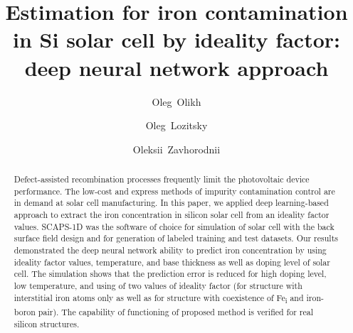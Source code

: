\documentclass[num-refs]{wiley-article} %
\title{Estimation for iron contamination in Si solar cell by ideality factor: deep neural network approach}
\author[1]{Oleg~Olikh}
\author[1]{Oleg~Lozitsky}
\author[1]{Oleksii~Zavhorodnii}
\affil[1]{Taras Shevchenko National University of Kyiv, 64/13, Volodymyrska Street, Kyiv, 01601, Ukraine}
\begin{document}
\begin{frontmatter}
\maketitle

\begin{abstract}
Defect-assisted recombination processes frequently
limit the photovoltaic device performance.
The low-cost and express methods of impurity contamination control
are in demand at solar cell manufacturing.
In this paper, we applied deep learning-based
approach to extract the iron concentration in silicon solar cell from an
ideality factor values.
SCAPS-1D was the software of choice for simulation of solar cell with the back surface field design
and for generation of labeled training and test datasets.
Our results demonstrated the deep neural network ability
to predict iron concentration by using ideality factor values, temperature, and base thickness as well as doping level of solar cell.
The simulation shows that the prediction error
is reduced for high doping level, low temperature, and using of two values of ideality factor (for structure with interstitial iron atoms only as well as for structure with
coexistence of Fe\textsubscript{i} and iron-boron pair).
The capability of functioning of proposed method is verified for real silicon structures.


\end{abstract}

\end{frontmatter}

\end{document}
